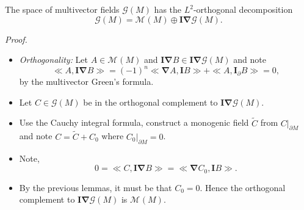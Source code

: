 \documentclass[aspectratio=169]{beamer}
\newcommand{\grad}{\boldsymbol{\nabla}}
\newcommand{\G}{\mathcal{G}}
\newcommand{\blade}[1]{\boldsymbol{#1}}
\newcommand{\multivecinnerproduct}[2]{\ll #1, #2\gg}
\newcommand{\boundary}{{\partial M}}
\newcommand{\pseudoscalar}{\blade{I}}
\newcommand{\monogenicfields}[1]{\mathcal{M}^{#1}(M)}
\begin{document}

\begin{frame}{}
\vfill
\begin{theorem}
The space of multivector fields $\G(M)$ has the $L^2$-orthogonal decomposition
\[
\G(M) = \monogenicfields{} \oplus \pseudoscalar \grad \G(M).
\]
\end{theorem}
\vfill
\end{frame}

\begin{frame}
\vfill
\emph{Proof.}
\begin{itemize}
\pause
\item \emph{Orthogonality:} Let $A \in \monogenicfields{}$ and $\pseudoscalar \grad B \in \pseudoscalar \grad \G(M)$ and note
\[
\multivecinnerproduct{A}{\pseudoscalar \grad B} = (-1)^n \multivecinnerproduct{\grad A}{\pseudoscalar B} + \multivecinnerproduct{A}{\pseudoscalar_\partial B} = 0,
\]
by the multivector Green's formula.
\end{itemize}
\vfill
\end{frame}

\begin{frame}{}
\vfill
\begin{itemize}
\pause
\item Let $C\in \G(M)$ be in the orthogonal complement to $\pseudoscalar \grad \G(M)$. 
\pause
\item Use the Cauchy integral formula, construct a monogenic field $\tilde{C}$ from $C\vert_\boundary$ and note $C=\tilde{C}+C_0$ where $C_0\vert_\boundary = 0$. 
\pause
\item Note,
\[
0 = \multivecinnerproduct{C}{\pseudoscalar \grad B} = \multivecinnerproduct{\grad C_0}{\pseudoscalar B}.
\]
\pause
\item By the previous lemmas, it must be that $C_0=0$. Hence the orthogonal complement to $\pseudoscalar \grad \G(M)$ is $\monogenicfields{}$.
\end{itemize}
\vfill
\end{frame}
\end{document}
